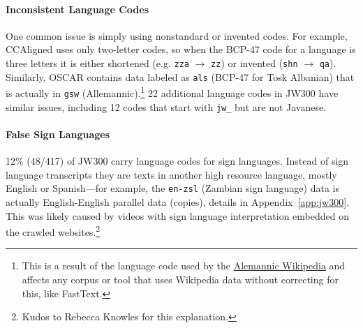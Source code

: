 \paragraph{Inconsistent Language Codes} One common issue is simply using nonstandard or invented codes. For example, CCAligned uses only two-letter codes, so when the BCP-47 code for a language is three letters it is either shortened (e.g. \texttt{zza} $\rightarrow$ \texttt{zz})
or invented (\texttt{shn}  $\rightarrow$ \texttt{qa}).
Similarly, OSCAR contains data labeled as \texttt{als} (BCP-47 for Tosk Albanian) that is actually in \texttt{gsw} (Allemannic).\footnote{This is a result of the language code used by the \href{https://en.wikipedia.org/wiki/Alemannic\_Wikipedia}{Alemannic Wikipedia} and affects any corpus or tool that uses Wikipedia data without correcting for this, like FastText.}
22 additional language codes in JW300 have similar issues,
including 12 codes that start with \texttt{jw\_} but are not %
Javanese.

\paragraph{False Sign Languages}
12\% (48/417) of JW300
carry language codes for sign languages. %
Instead of sign language transcripts they are texts in another high resource language, mostly English or Spanish---for example, the \texttt{en-zsl} (Zambian sign language) data is actually English-English parallel data (copies), details in Appendix~\ref{app:jw300}. This was likely caused by videos with sign language interpretation embedded on the crawled websites.\footnote{Kudos to Rebecca Knowles for this explanation.} %


